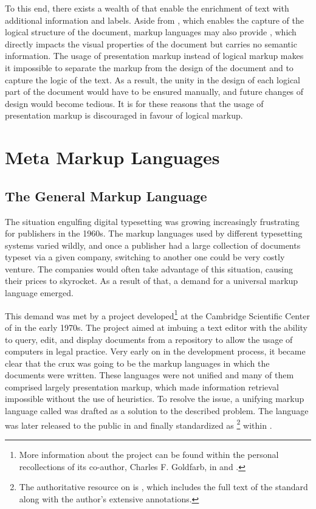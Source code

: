 \documentclass{book}
\begin{document}
To this end, there exists a wealth of  that enable the
enrichment of text with additional information and labels. Aside from
, which enables the capture of the logical structure of the
document, markup languages may also provide , which
directly impacts the visual properties of the document but carries no semantic
information. The usage of presentation markup instead of logical markup makes it
impossible to separate the markup from the design of the document and to capture
the logic of the text. As a result, the unity in the design of each logical
part of the document would have to be ensured manually, and future changes of
design would become tedious. It is for these reasons that the usage of
presentation markup is discouraged in favour of logical markup.

\section{Meta Markup Languages}
\subsection{The General Markup Language}
The situation engulfing digital typesetting was growing increasingly frustrating
for publishers in the 1960s. The markup languages used by different typesetting
systems varied wildly, and once a publisher had a large collection of documents
typeset via a given company, switching to another one could be very costly
venture. The companies would often take advantage of this situation, causing
their prices to skyrocket. As a result of that, a demand for a universal markup
language emerged.

This demand was met by a project developed\footnote{
  More information about the project can be found within the personal
  recollections of its co-author, Charles F. Goldfarb, in \cite{goldfarb96} and
  \cite{goldfarb97:whySGML}.
} at the Cambridge Scientific Center of  in the early 1970s. The
project aimed at imbuing a text editor with the ability to query, edit, and
display documents from a repository to allow the usage of computers in legal
practice. Very early on in the development process, it became clear that the
crux was going to be the markup languages in which the documents were written.
These languages were not unified and many of them comprised largely presentation
markup, which made information retrieval impossible without the use of
heuristics. To resolve the issue, a unifying markup language called
 was drafted as a solution to the described problem. The language
was later released to the public in \cite{goldfarb81} and finally standardized
as \footnote{
  The authoritative resource on  is \cite{goldfarb91}, which
  includes the full text of the standard along with the author's extensive
  annotations.
} within \cite{iso8879}.
\end{document}
